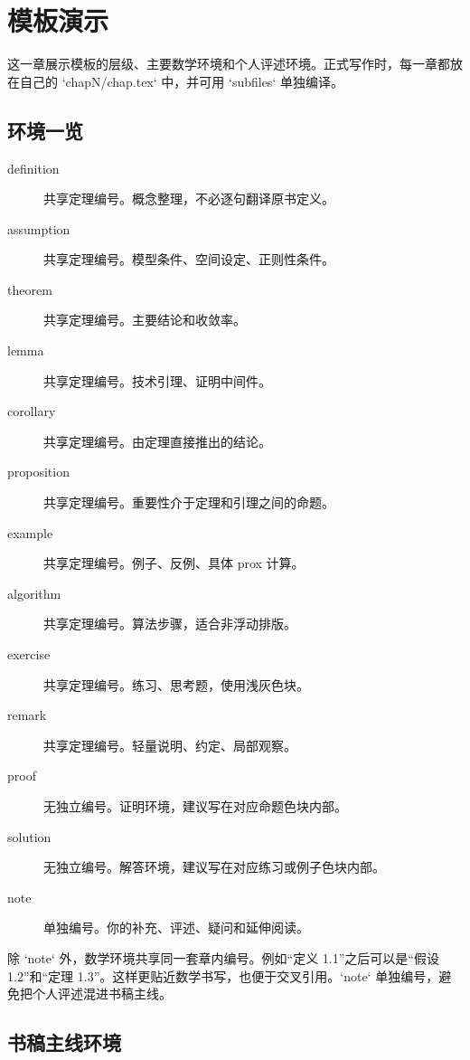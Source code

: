 \documentclass[../main.tex]{subfiles}
\begin{document}
\chapter{模板演示}

这一章展示模板的层级、主要数学环境和个人评述环境。正式写作时，每一章都放在自己的 `chapN/chap.tex` 中，并可用 `subfiles` 单独编译。

\section{环境一览}

\begin{description}
  \item[definition] 共享定理编号。概念整理，不必逐句翻译原书定义。
  \item[assumption] 共享定理编号。模型条件、空间设定、正则性条件。
  \item[theorem] 共享定理编号。主要结论和收敛率。
  \item[lemma] 共享定理编号。技术引理、证明中间件。
  \item[corollary] 共享定理编号。由定理直接推出的结论。
  \item[proposition] 共享定理编号。重要性介于定理和引理之间的命题。
  \item[example] 共享定理编号。例子、反例、具体 prox 计算。
  \item[algorithm] 共享定理编号。算法步骤，适合非浮动排版。
  \item[exercise] 共享定理编号。练习、思考题，使用浅灰色块。
  \item[remark] 共享定理编号。轻量说明、约定、局部观察。
  \item[proof] 无独立编号。证明环境，建议写在对应命题色块内部。
  \item[solution] 无独立编号。解答环境，建议写在对应练习或例子色块内部。
  \item[note] 单独编号。你的补充、评述、疑问和延伸阅读。
\end{description}

\begin{note}[编号策略]
除 `note` 外，数学环境共享同一套章内编号。例如“定义 1.1”之后可以是“假设 1.2”和“定理 1.3”。这样更贴近数学书写，也便于交叉引用。`note` 单独编号，避免把个人评述混进书稿主线。
\end{note}

\section{书稿主线环境}
\end{document}
